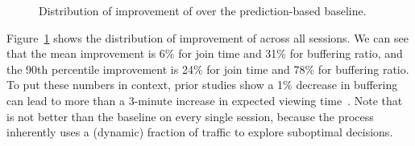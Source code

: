 \begin{figure}[t!]
\captionsetup[subfigure]{justification=centering,farskip=-1pt,captionskip=5pt}
\centering
\caption{Distribution of improvement of \name over the prediction-based baseline.}
\label{fig:eval-overall-quality}
\end{figure}

 Figure~\ref{fig:eval-overall-quality} shows
the distribution of improvement of \name across all sessions.  We can see that
the mean improvement is 6\% for join time and 31\% for buffering ratio, and the
90th percentile improvement is 24\% for join time and 78\% for buffering ratio.
To put these numbers in context, prior studies 
show a 1\% decrease in buffering can lead to more than a 3-minute increase 
in expected viewing time~\cite{sigcomm11conviva}.
Note that \name is not better than the baseline on every single 
session, because the \mab process inherently uses a
(dynamic) fraction of traffic to explore suboptimal decisions.


